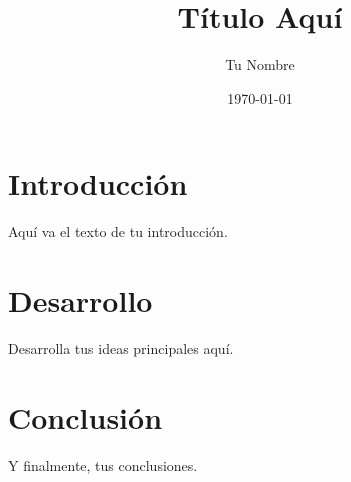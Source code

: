 \documentclass{article}
\begin{document}
\title{Título Aquí}
\author{Tu Nombre}
\date{\today}

\maketitle

\section{Introducción}
Aquí va el texto de tu introducción.

\section{Desarrollo}
Desarrolla tus ideas principales aquí.

\section{Conclusión}
Y finalmente, tus conclusiones.
\end{document}
